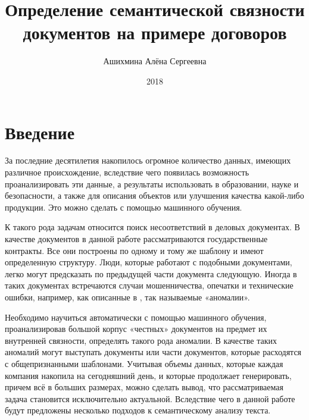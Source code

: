 \documentclass[12pt]{article}
\author{Ашихмина Алёна Сергеевна}
\title{Определение семантической связности \\ документов на примере договоров}
\date{2018}
\newcounter{c_tab}
\begin{document}
\maketitle{}
\newpage
\tableofcontents
\newpage
\section{Введение}
За последние десятилетия накопилось огромное количество данных, имеющих различное происхождение, вследствие чего появилась возможность проанализировать эти данные, а результаты использовать в образовании, науке и безопасности, а также для описания объектов или улучшения качества какой-либо продукции. Это можно сделать с помощью машинного обучения. 

К такого рода задачам относится поиск несоответствий в деловых документах. В качестве документов в данной работе рассматриваются государственные контракты. Все они построены по одному и тому же шаблону и имеют определенную структуру. Люди, которые работают с подобными документами, легко могут предсказать по предыдущей части документа следующую. Иногда в таких документах встречаются случаи мошенничества, опечатки и технические ошибки, например, как описанные в \cite{vedomosti,fontanka}, так называемые «аномалии». 

Необходимо научиться автоматически с помощью машинного обучения, проанализировав большой корпус «честных» документов на предмет их внутренней связности, определять такого рода аномалии. В качестве таких аномалий могут выступать документы или части документов, которые расходятся с общепризнанными шаблонами.
Учитывая объемы данных, которые каждая компания накопила на сегодняшний день, и которые продолжает генерировать, причем всё в больших размерах, можно сделать вывод, что рассматриваемая задача становится исключительно актуальной. Вследствие чего в данной работе будут предложены несколько подходов к семантическому анализу текста. 

\newpage
\end{document}
